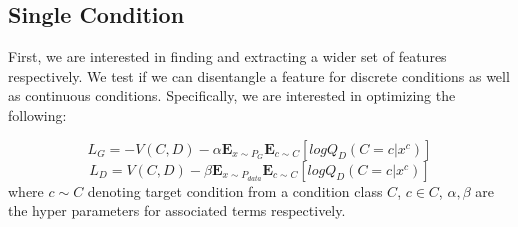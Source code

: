 \documentclass[11pt, letterpaper, oneside]{article}
\begin{document}
\subsection{Single Condition}
First, we are interested in finding and extracting a wider set of features respectively. We test if we can disentangle a feature for discrete conditions as well as continuous conditions. Specifically, we are interested in optimizing the following:

\begin{equation} \label{eu_eqn0}
L_G = -V(C, D) -\alpha \mathbf{E}_{x \sim P_G } \mathbf{E}_{c \sim C}[log Q_D(C = c|x^c)]
\end{equation}
\begin{equation} \label{eu_eqn01}
L_D = V(C, D) -\beta \mathbf{E}_{x \sim P_{data} } \mathbf{E}_{c \sim C}[log Q_D(C = c|x^c)]
\end{equation}
where $c \sim C$ denoting target condition from a condition class $C$, $c \in C$, $\alpha, \beta $ are the hyper parameters for associated terms respectively.
\end{document}
